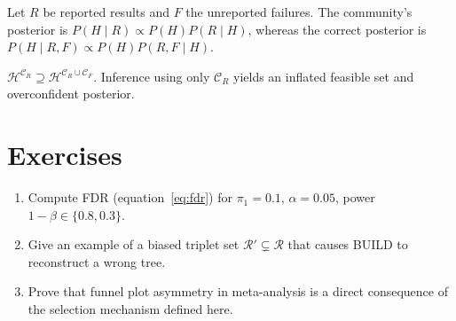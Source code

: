 Let $R$ be reported results and $F$ the unreported failures. The community's posterior is $P(H \mid R) \propto P(H) P(R \mid H)$, whereas the correct posterior is $P(H \mid R, F) \propto P(H) P(R,F \mid H)$.

\begin{theorem}
$\mathcal{H}^{\mathcal{C}_R} \supseteq \mathcal{H}^{\mathcal{C}_R \cup \mathcal{C}_F}$. Inference using only $\mathcal{C}_R$ yields an inflated feasible set and overconfident posterior.
\end{theorem}

\section{Exercises}

\begin{enumerate}
  \item Compute FDR (equation~\ref{eq:fdr}) for $\pi_1=0.1$, $\alpha=0.05$, power $1-\beta \in \{0.8, 0.3\}$.
  \item Give an example of a biased triplet set $\mathcal{R}' \subsetneq \mathcal{R}$ that causes BUILD to reconstruct a wrong tree.
  \item Prove that funnel plot asymmetry in meta-analysis is a direct consequence of the selection mechanism defined here.
\end{enumerate}
